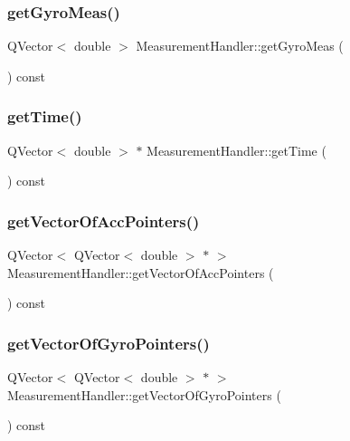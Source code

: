 \mbox{\label{class_measurement_handler_a80a29ba6bdd4aff53041f4c7f6ae90bd}} 
\subsubsection{get\+Gyro\+Meas()}
{\footnotesize\ttfamily Q\+Vector$<$ double $>$ Measurement\+Handler\+::get\+Gyro\+Meas (\begin{DoxyParamCaption}{ }\end{DoxyParamCaption}) const}

\mbox{\label{class_measurement_handler_a202be23096eca6bd4362a9aa5552b4f1}} 
\subsubsection{get\+Time()}
{\footnotesize\ttfamily Q\+Vector$<$ double $>$ $\ast$ Measurement\+Handler\+::get\+Time (\begin{DoxyParamCaption}{ }\end{DoxyParamCaption}) const}

\mbox{\label{class_measurement_handler_a18ae7fd0f8f2ed3e74e9a7cb87af92e3}} 
\subsubsection{get\+Vector\+Of\+Acc\+Pointers()}
{\footnotesize\ttfamily Q\+Vector$<$ Q\+Vector$<$ double $>$ $\ast$ $>$ Measurement\+Handler\+::get\+Vector\+Of\+Acc\+Pointers (\begin{DoxyParamCaption}{ }\end{DoxyParamCaption}) const}

\mbox{\label{class_measurement_handler_a15b2c74a4325c0ade1dd92f2b4afdabd}} 
\subsubsection{get\+Vector\+Of\+Gyro\+Pointers()}
{\footnotesize\ttfamily Q\+Vector$<$ Q\+Vector$<$ double $>$ $\ast$ $>$ Measurement\+Handler\+::get\+Vector\+Of\+Gyro\+Pointers (\begin{DoxyParamCaption}{ }\end{DoxyParamCaption}) const}

